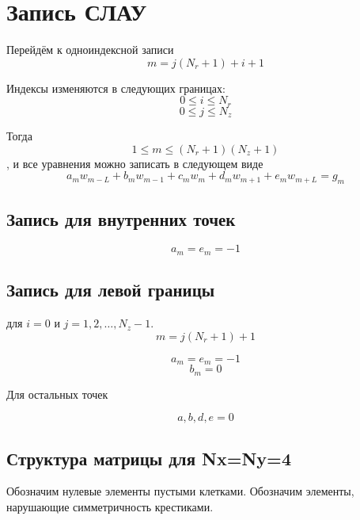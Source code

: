 \section{Запись СЛАУ}

Перейдём к одноиндексной записи
\[ m = j(N_r + 1) + i + 1 \]

Индексы изменяются в следующих границах:
\[ 0 \leq i \leq N_r \]
\[ 0 \leq j \leq N_z \]

Тогда
\[ 1 \le m \le (N_r + 1)(N_z + 1) \]
, и все уравнения можно записать в следующем виде
\[ a_m w_{m - L} + b_m w_{m - 1} + c_m w_m + d_m w_{m + 1} + e_m w_{m + L} = g_m \]

\subsection{Запись для внутренних точек}

\[ a_m = e_m = -1 \]

\subsection{Запись для левой границы}

для $ i = 0 $ и $ j = 1, 2, \dots, N_z - 1$.
\[ m = j(N_r + 1) + 1 \]

\[ a_m = e_m = -1 \]
\[ b_m = 0 \]

Для остальных точек

\[ a,b,d,e = 0 \]

\subsection{Структура матрицы для Nx=Ny=4}

Обозначим нулевые элементы пустыми клетками. Обозначим элементы, нарушающие симметричность крестиками.

